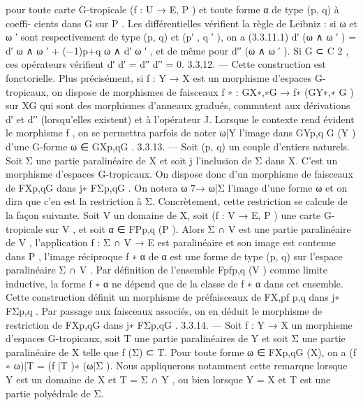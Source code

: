 \documentclass[
  10pt,
]{article}
\newenvironment{Shaded}{}{}
\newcommand{\NormalTok}[1]{#1}
\begin{document}
\begin{Shaded}
\begin{Highlighting}[]
\NormalTok{pour toute carte G{-}tropicale (f : U → E, P ) et toute forme α de type (p, q) à coeffi{-}}
\NormalTok{cients dans G sur P . Les différentielles vérifient la règle de Leibniz : si ω et ω ′ sont}
\NormalTok{respectivement de type (p, q) et (p′ , q ′ ), on a}
\NormalTok{(3.3.11.1)               d′ (ω ∧ ω ′ ) = d′ ω ∧ ω ′ + (−1)p+q ω ∧ d′ ω ′ ,}
\NormalTok{et de même pour d′′ (ω ∧ ω ′ ).}
\NormalTok{   Si G ⊂ C 2 , ces opérateurs vérifient d′ d′ = d′′ d′′ = 0.}
\NormalTok{3.3.12. — Cette construction est fonctorielle. Plus précisément, si f : Y → X est un}
\NormalTok{morphisme d’espaces G{-}tropicaux, on dispose de morphismes de faisceaux}
\NormalTok{                                     f ∗ : GX∗,∗G → f∗ (GY∗,∗}
\NormalTok{                                                           G}
\NormalTok{                                                              )}
\NormalTok{sur XG qui sont des morphismes d’anneaux gradués, commutent aux dérivations d′ et}
\NormalTok{d′′ (lorsqu’elles existent) et à l’opérateur J.}
\NormalTok{   Lorsque le contexte rend évident le morphisme f , on se permettra parfois de noter}
\NormalTok{ω|Y l’image dans GYp,q G}
\NormalTok{                         (Y ) d’une G{-}forme ω ∈ GXp,qG .}
\NormalTok{3.3.13. — Soit (p, q) un couple d’entiers naturels. Soit Σ une partie paralinéaire de X}
\NormalTok{et soit j l’inclusion de Σ dans X. C’est un morphisme d’espaces G{-}tropicaux. On dispose}
\NormalTok{donc d’un morphisme de faisceaux de FXp,qG dans j∗ FΣp,qG . On notera ω 7→ ω|Σ l’image}
\NormalTok{d’une forme ω et on dira que c’en est la restriction à Σ.}
\NormalTok{   Concrètement, cette restriction se calcule de la façon suivante.}
\NormalTok{   Soit V un domaine de X, soit (f : V → E, P ) une carte G{-}tropicale sur V , et soit}
\NormalTok{α ∈ FPp,q (P ). Alors Σ ∩ V est une partie paralinéaire de V , l’application f : Σ ∩ V → E}
\NormalTok{est paralinéaire et son image est contenue dans P , l’image réciproque f ∗ α de α est}
\NormalTok{une forme de type (p, q) sur l’espace paralinéaire Σ ∩ V . Par définition de l’ensemble}
\NormalTok{Fpfp,q (V ) comme limite inductive, la forme f ∗ α ne dépend que de la classe de f ∗ α dans}
\NormalTok{cet ensemble. Cette construction définit un morphisme de préfaisceaux de FX,pf     p,q}
\NormalTok{                                                                                       dans}
\NormalTok{j∗ FΣp,q .}
\NormalTok{   Par passage aux faisceaux associés, on en déduit le morphisme de restriction de FXp,qG}
\NormalTok{dans j∗ FΣp,qG .}
\NormalTok{3.3.14. — Soit f : Y → X un morphisme d’espaces G{-}tropicaux, soit T une partie}
\NormalTok{paralinéaires de Y et soit Σ une partie paralinéaire de X telle que f (Σ) ⊂ T. Pour toute}
\NormalTok{forme ω ∈ FXp,qG (X), on a (f ∗ ω)|T = (f |T )∗ (ω|Σ ).}
\NormalTok{   Nous appliquerons notamment cette remarque lorsque Y est un domaine de X et}
\NormalTok{T = Σ ∩ Y , ou bien lorsque Y = X et T est une partie polyédrale de Σ.}




\end{Highlighting}
\end{Shaded}
\end{document}
